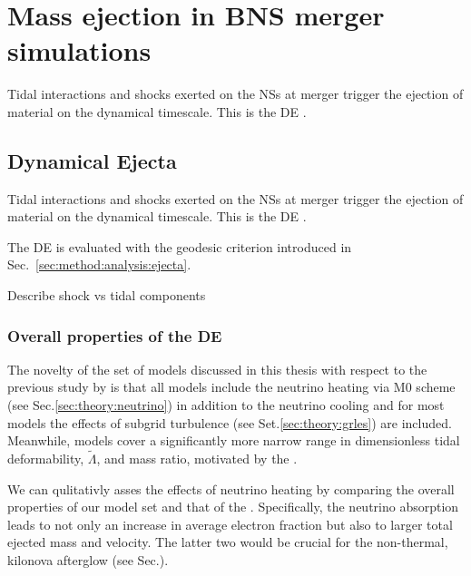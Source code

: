 \section{Mass ejection in \ac{BNS} merger simulations}



Tidal interactions and shocks exerted on the \acp{NS} at merger trigger the ejection of material
on the dynamical timescale. This is the \ac{DE} \citep[\eg][]{Hotokezaka:2013b,Bauswein:2013yna,Radice:2016dwd,Radice:2018pdn}. 



\subsection{Dynamical Ejecta}


Tidal interactions and shocks exerted on the \acp{NS} at merger trigger the ejection of material
on the dynamical timescale. This is the \ac{DE} \citep[\eg][]{Hotokezaka:2013b,Bauswein:2013yna,Radice:2016dwd,Radice:2018pdn}. 

The \ac{DE} is evaluated with the geodesic criterion introduced in Sec.~\ref{sec:method:analysis:ejecta}.

Describe shock vs tidal components 

\subsubsection{Overall properties of the \ac{DE}}


The novelty of the set of models discussed in this thesis with respect to the 
previous study by \citet{Radice:2018pdn} is that all models include the neutrino heating via M0 scheme 
(see Sec.\ref{sec:theory:neutrino}) in addition to the neutrino cooling and for most models the effects 
of subgrid turbulence (see Set.\ref{sec:theory:grles}) are included.
Meanwhile, models cover a significantly more narrow range in 
dimensionless tidal deformability, $\tilde{\Lambda}$, and mass ratio, motivated by the \GW{}.

We can qulitativly asses the effects of neutrino heating by comparing the overall properties 
of our model set and that of the \citet{Radice:2018pdn}.
Specifically, the neutrino absorption leads to not only an increase in average electron 
fraction but also to larger total ejected mass and velocity. The latter two would be 
crucial for the non-thermal, kilonova afterglow (see Sec.).

